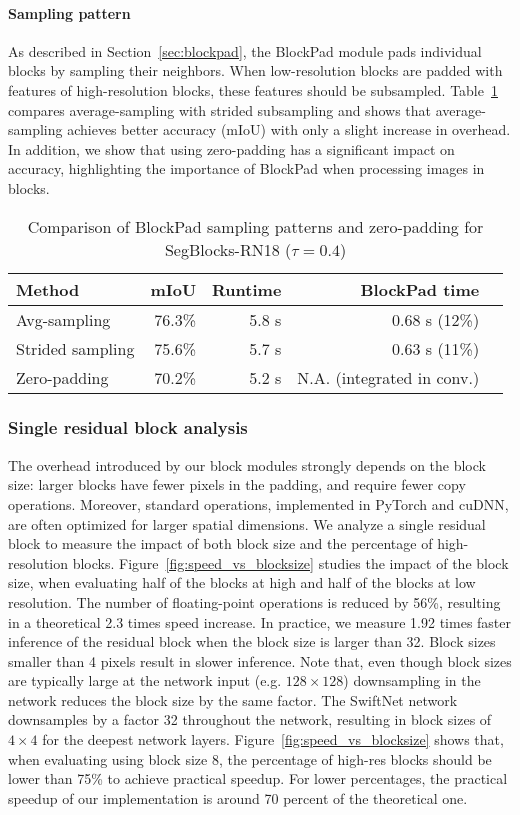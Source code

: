 \paragraph*{\textbf{Sampling pattern}}
As described in Section~\ref{sec:blockpad}, the BlockPad module pads individual blocks by sampling their neighbors. When low-resolution blocks are padded with features of high-resolution blocks, these features should be subsampled. Table~\ref{tab:sampling} compares average-sampling with strided subsampling and shows that average-sampling achieves better accuracy (mIoU) with only a slight increase in overhead. In addition, we show that using zero-padding has a significant impact on accuracy, highlighting the importance of BlockPad when processing images in blocks. 

\begin{table}[!tb]
\scriptsize
\caption{Comparison of BlockPad sampling patterns and zero-padding for SegBlocks-RN18 ($\tau{=}0.4$) \label{tab:sampling}}
\centering
\begin{tabular}{@{}lrrrr@{}}
\toprule
\textbf{Method} & \textbf{mIoU} & \textbf{Runtime} & \textbf{BlockPad time} \\ \midrule
Avg-sampling & 76.3\% & 5.8 s & 0.68 s (12\%) \\
Strided sampling & 75.6\% & 5.7 s & 0.63 s (11\%) \\
Zero-padding & 70.2\% & 5.2 s & N.A. (integrated in conv.)\\
\bottomrule
\end{tabular}
\end{table}

\subsubsection{Single residual block analysis}
The overhead introduced by our block modules strongly depends on the block size: larger blocks have fewer pixels in the padding, and require fewer copy operations. Moreover, standard operations, implemented in PyTorch and cuDNN, are often optimized for larger spatial dimensions. We analyze a single residual block to measure the impact of both block size and the percentage of high-resolution blocks.
Figure~\ref{fig:speed_vs_blocksize} studies the impact of the block size, when evaluating half of the blocks at high and half of the blocks at low resolution. The number of floating-point operations is reduced by 56\%, resulting in a theoretical 2.3 times speed increase. In practice, we measure 1.92 times faster inference of the residual block when the block size is larger than 32. Block sizes smaller than 4 pixels result in {slower} inference. Note that, even though block sizes are typically large at the network input (e.g. $128{\times}128$) downsampling in the network reduces the block size by the same factor. The SwiftNet network downsamples by a factor 32 throughout the network, resulting in block sizes of $4{\times}4$ for the deepest network layers.
Figure~\ref{fig:speed_vs_blocksize} shows that, when evaluating using block size 8, the percentage of high-res blocks should be lower than 75\% to achieve practical speedup. For lower percentages, the practical speedup of our implementation is around 70 percent of the theoretical one.

